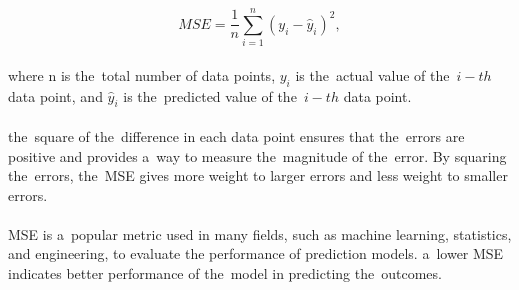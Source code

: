     \begin{equation}
    MSE = \frac{1}{n}\sum_{i=1}^{n}(y_i - \hat{y}_i)^2,
    \end{equation}
    \\
    where n is the~total number of data points, $y_i$ is the~actual value of the~$i-th$ data point, and $\hat{y}_i$ is
    the~predicted value of the~$i-th$ data point.\\
    \\
    the~square of the~difference in each data point ensures that the~errors are positive and provides a~way to measure
    the~magnitude of the~error. By squaring the~errors, the~MSE gives more weight to larger errors and less weight to
    smaller errors.\\
    \\
    MSE is a~popular metric used in many fields, such as machine learning, statistics, and engineering, to evaluate the
    performance of prediction models. a~lower MSE indicates better performance of the~model in predicting the~outcomes.
